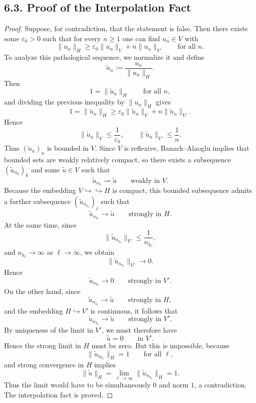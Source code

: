 \documentclass[11pt]{article}
\theoremstyle{definition}
\theoremstyle{remark}
\begin{document}
\subsection*{6.3. Proof of the Interpolation Fact}
\begin{proof}
Suppose, for contradiction, that the statement is false. Then there exists some $\varepsilon_0>0$ such that for every $n\ge 1$ one can find $u_n\in V$ with
\[
  \|u_n\|_H\ge \varepsilon_0\|u_n\|_V+n\|u_n\|_{V'}
  \qquad \text{for all } n.
\]
To analyze this pathological sequence, we normalize it and define
\[
  \widetilde u_n:=\frac{u_n}{\|u_n\|_H}.
\]
Then
\[
  1=\|\widetilde u_n\|_H
  \qquad \text{for all } n,
\]
and dividing the previous inequality by $\|u_n\|_H$ gives
\[
  1=\|\widetilde u_n\|_H\ge \varepsilon_0\|\widetilde u_n\|_V+n\|\widetilde u_n\|_{V'}.
\]
Hence
\[
  \|\widetilde u_n\|_V\le \frac{1}{\varepsilon_0},
  \qquad
  \|\widetilde u_n\|_{V'}\le \frac{1}{n}.
\]
Thus $(\widetilde u_n)_n$ is bounded in $V$. Since $V$ is reflexive, Banach--Alaoglu implies that bounded sets are weakly relatively compact, so there exists a subsequence $(\widetilde u_{n_k})_k$ and some $\widetilde u\in V$ such that
\[
  \widetilde u_{n_k}\rightharpoonup \widetilde u
  \qquad \text{weakly in } V.
\]
Because the embedding $V\hookrightarrow\hookrightarrow H$ is compact, this bounded subsequence admits a further subsequence $(\widetilde u_{n_{k_\ell}})_\ell$ such that
\[
  \widetilde u_{n_{k_\ell}}\to \widetilde u
  \qquad \text{strongly in } H.
\]
At the same time, since
\[
  \|\widetilde u_{n_{k_\ell}}\|_{V'}\le \frac{1}{n_{k_\ell}},
\]
and $n_{k_\ell}\to\infty$ as $\ell\to\infty$, we obtain
\[
  \|\widetilde u_{n_{k_\ell}}\|_{V'}\to 0.
\]
Hence
\[
  \widetilde u_{n_{k_\ell}}\to 0
  \qquad \text{strongly in } V'.
\]
On the other hand, since
\[
  \widetilde u_{n_{k_\ell}}\to \widetilde u
  \qquad \text{strongly in } H,
\]
and the embedding $H\hookrightarrow V'$ is continuous, it follows that
\[
  \widetilde u_{n_{k_\ell}}\to \widetilde u
  \qquad \text{strongly in } V'.
\]
By uniqueness of the limit in $V'$, we must therefore have
\[
  \widetilde u=0
  \qquad \text{in } V'.
\]
Hence the strong limit in $H$ must be zero. But this is impossible, because
\[
  \|\widetilde u_{n_{k_\ell}}\|_H=1
  \qquad \text{for all } \ell,
\]
and strong convergence in $H$ implies
\[
  \|\widetilde u\|_H=\lim_{\ell\to\infty}\|\widetilde u_{n_{k_\ell}}\|_H=1.
\]
Thus the limit would have to be simultaneously $0$ and norm $1$, a contradiction. The interpolation fact is proved.
\end{proof}
\end{document}
